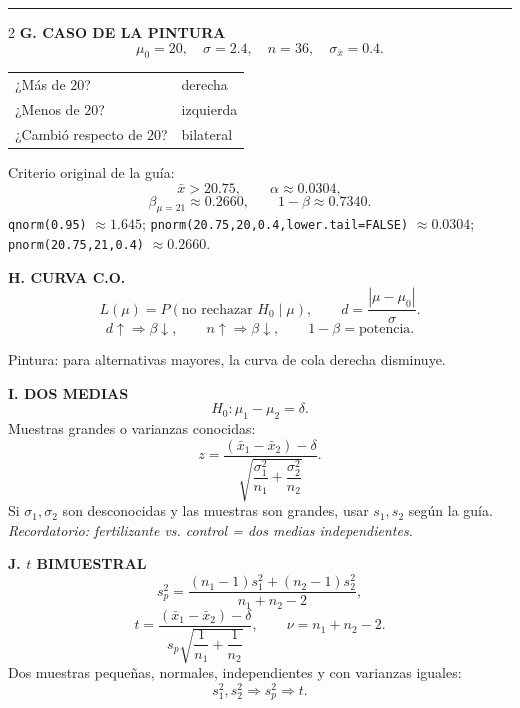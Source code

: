 \documentclass[11pt,a4paper]{article}
\begin{document}
\newpage
{}\par
\vspace{1mm}\hrule\vspace{2mm}
\footnotesize
\begin{multicols}{2}
\textbf{G. CASO DE LA PINTURA}
\[
\mu_0=20,\quad\sigma=2.4,\quad n=36,
\quad\sigma_{\bar{x}}=0.4.
\]
\begin{center}
\begin{tabular}{ll}
¿Más de $20$? & derecha\\
¿Menos de $20$? & izquierda\\
¿Cambió respecto de $20$? & bilateral
\end{tabular}
\end{center}
Criterio original de la guía:
\[
\bar{x}>20.75,\qquad \alpha\approx0.0304,
\]
\[
\beta_{\mu=21}\approx0.2660,\qquad 1-\beta\approx0.7340.
\]
\scriptsize
\texttt{qnorm(0.95)} $\approx1.645$;\quad
\texttt{pnorm(20.75,20,0.4,lower.tail=FALSE)} $\approx0.0304$;\quad
\texttt{pnorm(20.75,21,0.4)} $\approx0.2660$.
\footnotesize

\textbf{H. CURVA C.O.}
\[
L(\mu)=P(\text{no rechazar }H_0\mid\mu),
\qquad d=\frac{|\mu-\mu_0|}{\sigma}.
\]
\[
d\uparrow\Rightarrow\beta\downarrow,\qquad
n\uparrow\Rightarrow\beta\downarrow,\qquad
1-\beta=\text{potencia}.
\]
\begin{center}
\end{center}
Pintura: para alternativas mayores, la curva de cola derecha disminuye.

\textbf{I. DOS MEDIAS}
\[
H_0:\mu_1-\mu_2=\delta.
\]
Muestras grandes o varianzas conocidas:
\[
z=\frac{(\bar{x}_1-\bar{x}_2)-\delta}
{\sqrt{\dfrac{\sigma_1^2}{n_1}+\dfrac{\sigma_2^2}{n_2}}}.
\]
Si $\sigma_1,\sigma_2$ son desconocidas y las muestras son grandes, usar $s_1,s_2$ según la guía.\\
\textit{Recordatorio: fertilizante vs. control = dos medias independientes.}

\columnbreak
\textbf{J. $t$ BIMUESTRAL}
\[
s_p^2=\frac{(n_1-1)s_1^2+(n_2-1)s_2^2}{n_1+n_2-2},
\]
\[
t=\frac{(\bar{x}_1-\bar{x}_2)-\delta}
{s_p\sqrt{\dfrac1{n_1}+\dfrac1{n_2}}},
\qquad\nu=n_1+n_2-2.
\]
Dos muestras pequeñas, normales, independientes y con varianzas iguales:
\[
s_1^2,s_2^2\Rightarrow s_p^2\Rightarrow t.
\]


\end{multicols}
\end{document}
